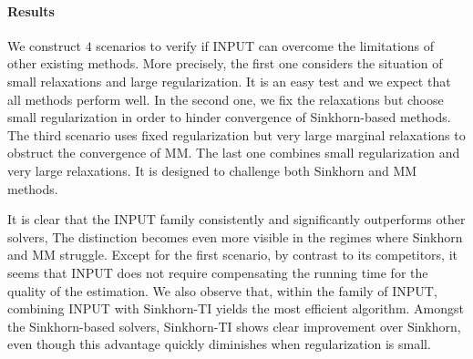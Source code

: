 \paragraph{Results}
We construct $4$ scenarios to verify if INPUT can overcome the limitations of other existing methods.
More precisely, the first one considers the situation of small relaxations and large regularization.
It is an easy test and we expect that all methods perform well.
In the second one, we fix the relaxations but choose small regularization
in order to hinder convergence of Sinkhorn-based methods.
The third scenario uses fixed regularization but very large marginal relaxations to obstruct
the convergence of MM.
The last one combines small regularization and very large relaxations. It is designed to challenge
both Sinkhorn and MM methods.

It is clear that the INPUT family consistently and significantly outperforms other solvers,
The distinction becomes even more visible in the regimes where Sinkhorn and MM struggle.
Except for the first scenario, by contrast to its competitors,
it seems that INPUT does not require compensating the running time for the quality of the estimation.
We also observe that, within the family of INPUT,
combining INPUT with Sinkhorn-TI yields the most efficient algorithm.
Amongst the Sinkhorn-based solvers, Sinkhorn-TI shows clear improvement over Sinkhorn,
even though this advantage quickly diminishes when regularization is small.

